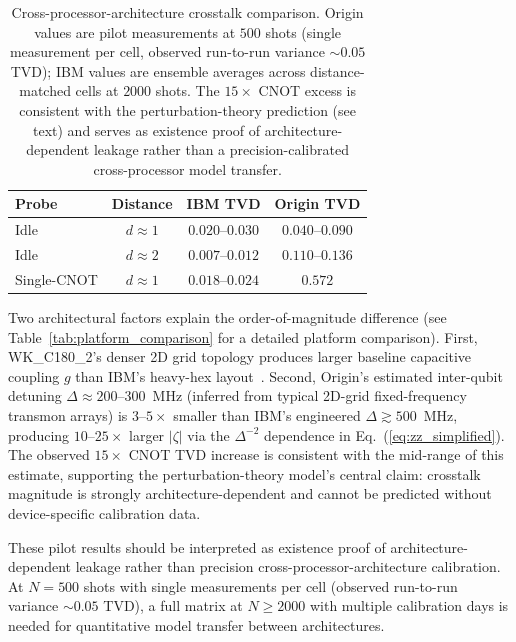 \documentclass[ASNA,twocolumn]{USG}
\begin{document}
\begin{table}[t]
\centering
\caption{Cross-processor-architecture crosstalk comparison. Origin values are pilot measurements at $500$ shots (single measurement per cell, observed run-to-run variance $\sim 0.05$ TVD); IBM values are ensemble averages across distance-matched cells at $2000$ shots. The $15\times$ CNOT excess is consistent with the perturbation-theory prediction (see text) and serves as existence proof of architecture-dependent leakage rather than a precision-calibrated cross-processor model transfer.}
\label{tab:origin}
\begin{tabular}{lccc}
\toprule
Probe & Distance & IBM TVD & Origin TVD \\
\midrule
Idle       & $d \approx 1$ & $0.020$--$0.030$ & $\mathbf{0.040}$--$\mathbf{0.090}$ \\
Idle       & $d \approx 2$ & $0.007$--$0.012$ & $\mathbf{0.110}$--$\mathbf{0.136}$ \\
Single-CNOT & $d \approx 1$ & $0.018$--$0.024$ & $\mathbf{0.572}$ \\
\bottomrule
\end{tabular}
\end{table}

Two architectural factors explain the order-of-magnitude difference (see Table~\ref{tab:platform_comparison} for a detailed platform comparison). First, WK\_C180\_2's denser 2D grid topology produces larger baseline capacitive coupling $g$ than IBM's heavy-hex layout~\cite{alghadeer2025low}. Second, Origin's estimated inter-qubit detuning $\Delta \approx 200$--$300$~MHz (inferred from typical 2D-grid fixed-frequency transmon arrays) is $3$--$5\times$ smaller than IBM's engineered $\Delta \gtrsim 500$~MHz, producing $10$--$25\times$ larger $|\zeta|$ via the $\Delta^{-2}$ dependence in Eq.~(\ref{eq:zz_simplified}). The observed $15\times$ CNOT TVD increase is consistent with the mid-range of this estimate, supporting the perturbation-theory model's central claim: crosstalk magnitude is strongly architecture-dependent and cannot be predicted without device-specific calibration data.

These pilot results should be interpreted as existence proof of architecture-dependent leakage rather than precision cross-processor-architecture calibration. At $N = 500$ shots with single measurements per cell (observed run-to-run variance $\sim 0.05$ TVD), a full matrix at $N \geq 2000$ with multiple calibration days is needed for quantitative model transfer between architectures.
\end{document}
